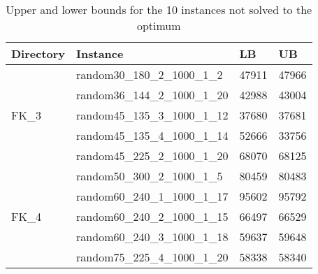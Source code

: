 \begin{table}[!htbp]
    \centering
    \begin{tabular}{@{}llll@{}}
        \toprule
        Directory              & Instance                      & LB    & UB    \\ \midrule
        \multirow{5}{*}{FK\_3} & random30\_180\_2\_1000\_1\_2  & 47911 & 47966 \\
        & random36\_144\_2\_1000\_1\_20 & 42988 & 43004 \\
        & random45\_135\_3\_1000\_1\_12 & 37680 & 37681 \\
        & random45\_135\_4\_1000\_1\_14 & 52666 & 33756 \\
        & random45\_225\_2\_1000\_1\_20 & 68070 & 68125 \\ \midrule
        \multirow{5}{*}{FK\_4} & random50\_300\_2\_1000\_1\_5  & 80459 & 80483 \\
        & random60\_240\_1\_1000\_1\_17 & 95602 & 95792 \\
        & random60\_240\_2\_1000\_1\_15 & 66497 & 66529 \\
        & random60\_240\_3\_1000\_1\_18 & 59637 & 59648 \\
        & random75\_225\_4\_1000\_1\_20 & 58338 & 58340 \\ \bottomrule
    \end{tabular}
    \caption{Upper and lower bounds for the 10 instances not solved to the optimum}
    \label{tab:exact_noopt}
\end{table}
